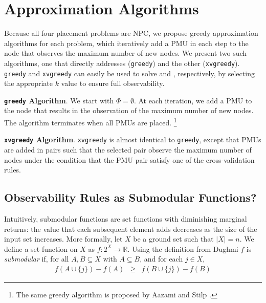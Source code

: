 \section{Approximation Algorithms}
\label{sec:approx}

Because all four placement problems are NPC, we propose greedy approximation algorithms for each problem, which iteratively add 
a PMU in each step to the node that observes the maximum number of new nodes. We present two such algorithms, one that directly addresses \maxinc ({\tt greedy}) and the other 
\xvalpart ({\tt xvgreedy}). {\tt greedy} and {\tt xvgreedy} can easily be used to solve \full and \xvals, respectively, by selecting the appropriate $k$ value to ensure full observability.

{\bf {\tt greedy} Algorithm}. We start with $\Phi = \emptyset$.  At each iteration, we add a PMU to the node that results in the observation of the maximum number of 
new nodes. The algorithm terminates when all PMUs are placed.  {\footnote {\small The same greedy algorithm is proposed by Aazami and Stilp \cite{Aazami07}. }}


{\bf {\tt xvgreedy} Algorithm}. {\tt xvgreedy} is almost identical to {\tt greedy}, except that PMUs are added in pairs such that the selected pair observe
the maximum number of nodes under the condition that the PMU pair satisfy one of the cross-validation rules. %





\subsection{Observability Rules as Submodular Functions?}

Intuitively, submodular functions are set functions with diminishing marginal returns: the value that each subsequent element adds decreases
as the size of the input set increases. More formally, let $X$ be a ground set such that $|X|=n$. We define a set function on $X$ as $f: 2^X \rightarrow \mathbb{R}$.
Using the definition from Dughmi \cite{Dughmi09} %
$f$ is \emph{submodular} if, for all $A,B \subseteq X$ with $A \subseteq B$, and for each $j \in X$,
\begin{eqnarray}
f(A \cup \{j\}) - f(A) &\geq& f(B \cup \{j\}) - f(B)
\end{eqnarray}

